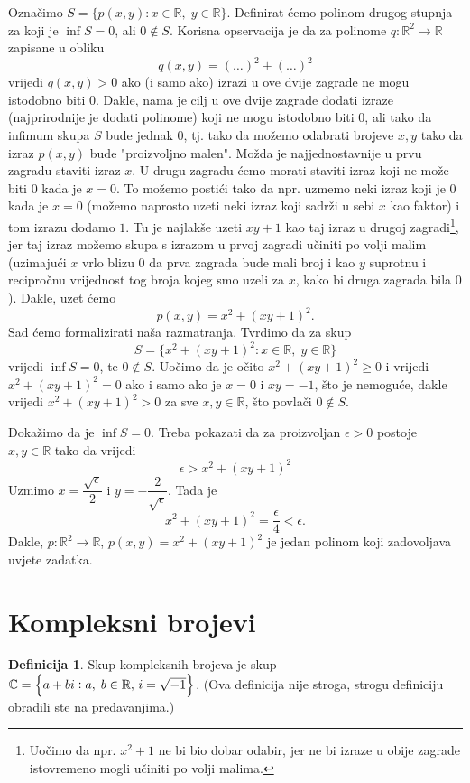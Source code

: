 \documentclass{book}
\let\originalleft\left
\let\originalright\right
\renewcommand{\left}{\mathopen{}\mathclose\bgroup\originalleft}
\renewcommand{\right}{\aftergroup\egroup\originalright}
\renewenvironment{proof}{%
    \vspace{-\parskip}\begin{oldproof}%
    }{%
    \end{oldproof}%
}
\theoremstyle{definition}
\theoremstyle{definition}
\newtheorem{definition}{Definicija}
\theoremstyle{remark}
\begin{document}
\begin{proof}[Rješenje]
Označimo $S=\{p(x, y) : x\in \mathbb{R},\; y\in \mathbb{R}\}$. Definirat ćemo polinom drugog stupnja za koji je $\inf{S}=0$, ali $0\notin S$. Korisna opservacija je da za polinome $q : \mathbb{R}^2\to \mathbb{R}$ zapisane u obliku
$$q(x, y)=(\dots)^2+(\dots)^2$$
vrijedi $q(x, y)>0$ ako (i samo ako) izrazi u ove dvije zagrade ne mogu istodobno biti $0$. Dakle, nama je cilj u ove dvije zagrade dodati izraze (najprirodnije je dodati polinome) koji ne mogu istodobno biti $0$, ali tako da infimum skupa $S$ bude jednak $0$, tj. tako da možemo odabrati brojeve $x, y$ tako da izraz $p(x, y)$ bude "proizvoljno malen". Možda je najjednostavnije u prvu zagradu staviti izraz $x$. U drugu zagradu ćemo morati staviti izraz koji ne može biti $0$ kada je $x=0$. To možemo postići tako da npr. uzmemo neki izraz koji je $0$ kada je $x=0$ (možemo naprosto uzeti neki izraz koji sadrži u sebi $x$ kao faktor) i tom izrazu dodamo $1$. Tu je najlakše uzeti $xy+1$ kao taj izraz u drugoj zagradi\footnote{Uočimo da npr. $x^2+1$ ne bi bio dobar odabir, jer ne bi izraze u obije zagrade istovremeno mogli učiniti po volji malima.}, jer taj izraz možemo skupa s izrazom u prvoj zagradi učiniti po volji malim (uzimajući $x$ vrlo blizu $0$ da prva zagrada bude mali broj i kao $y$ suprotnu i recipročnu vrijednost tog broja kojeg smo uzeli za $x$, kako bi druga zagrada bila $0$). Dakle, uzet ćemo
$$p(x, y)=x^2+(xy+1)^2.$$
Sad ćemo formalizirati naša razmatranja. Tvrdimo da za skup
$$S=\{x^2+(xy+1)^2 : x\in \mathbb{R},\; y\in \mathbb{R}\}$$
vrijedi $\inf{S}=0$, te $0\notin S$. Uočimo da je očito $x^2+(xy+1)^2\geq 0$ i vrijedi $x^2+(xy+1)^2=0$ ako i samo ako je $x=0$ i $xy=-1$, što je nemoguće, dakle vrijedi $x^2+(xy+1)^2>0$ za sve $x, y\in \mathbb{R}$, što povlači $0\notin S$.

Dokažimo da je $\inf{S}=0$. Treba pokazati da za proizvoljan $\epsilon>0$ postoje $x, y\in \mathbb{R}$ tako da vrijedi
$$\epsilon> x^2+(xy+1)^2$$
Uzmimo $x=\dfrac{\sqrt{\epsilon}}{2}$ i $y=-\dfrac{2}{\sqrt{\epsilon}}$. Tada je
$$x^2+(xy+1)^2=\dfrac{\epsilon}{4}<\epsilon.$$
Dakle, $p : \mathbb{R}^2\to \mathbb{R}$, $p(x, y)=x^2+(xy+1)^2$ je jedan polinom koji zadovoljava uvjete zadatka.
\end{proof}
\section{Kompleksni brojevi}

\begin{definition}
Skup kompleksnih brojeva je skup $\mathbb{C}=\left\{a+bi : a,\; b\in \mathbb{R},\, i=\sqrt{-1}\right\}$.
(Ova definicija nije stroga, strogu definiciju obradili ste na predavanjima.)
\end{definition}
\end{document}
